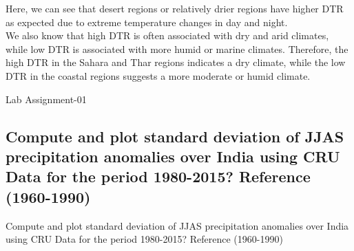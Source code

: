 \documentclass[10pt, a4paper]{article}
\begin{document}
Here, we can see that desert regions or relatively drier regions have higher DTR as expected due to extreme temperature changes in day and night. \\

We also know that high DTR is often associated with dry and arid climates, while low DTR is associated with more humid or marine climates. Therefore, the high DTR in the Sahara and Thar regions indicates a dry climate, while the low DTR in the coastal regions suggests a more moderate or humid climate.

\newpage
Lab Assignment-01

\subsection*{Compute and plot standard deviation of JJAS precipitation anomalies over India using CRU Data for the period 1980-2015? Reference (1960-1990)}
\begin{Problem}
    Compute and plot standard deviation of JJAS precipitation anomalies over India using CRU Data for the period 1980-2015? Reference (1960-1990)
\end{Problem}
\end{document}
